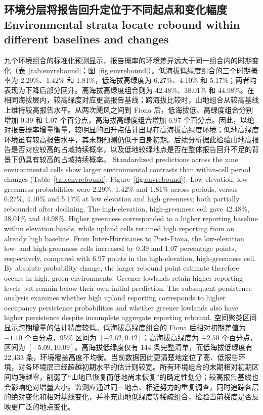 \subsection{\ifzh 环境分层将报告回升定位于不同起点和变化幅度\else Environmental strata locate rebound within different baselines and changes\fi}
\ifzh
九个环境组合的标准化预测显示，报告概率的环境差异远大于同一组合内的时期变化（表~\ref{tab:envrebound}；图~\ref{fig:envrebound}）。低海拔低绿度组合的三个时期概率为 2.29\%、1.42\% 和 1.81\%，低海拔高绿度为 6.27\%、4.10\% 和 5.17\%；两者均表现为下降后部分回升。高海拔高绿度组合则为 42.48\%、38.01\% 和 44.98\%。在相同海拔层内，较高绿度对应更高报告基线；跨海拔比较时，山地组合从较高基线上维持较高报告水平。从两次飓风之间到 Fiona 后，低海拔低、高绿度组合分别增加 0.39 和 1.07 个百分点，高海拔高绿度组合增加 6.97 个百分点。因此，以绝对报告概率增量衡量，较明显的回升点估计出现在高海拔高绿度环境；低地高绿度环境虽有较高报告水平，其末期预测仍低于自身初期。后续分析据此检验山地高报告是否对应较高的占域持续概率，以及低地较绿地点是否在整体报告回升不足的背景下仍具有较高的占域持续概率。
\else
Standardized predictions across the nine environmental cells show larger environmental contrasts than within-cell period changes (Table~\ref{tab:envrebound}; Figure~\ref{fig:envrebound}). Low-elevation, low-greenness probabilities were 2.29\%, 1.42\% and 1.81\% across periods, versus 6.27\%, 4.10\% and 5.17\% at low elevation and high greenness; both partially rebounded after declining. The high-elevation, high-greenness cell gave 42.48\%, 38.01\% and 44.98\%. Higher greenness corresponded to a higher reporting baseline within elevation bands, while upland cells retained high reporting from an already high baseline. From Inter-Hurricanes to Post-Fiona, the low-elevation low- and high-greenness cells increased by 0.39 and 1.07 percentage points, respectively, compared with 6.97 points in the high-elevation, high-greenness cell. By absolute probability change, the larger rebound point estimate therefore occurs in high, green environments. Greener lowlands retain higher reporting levels but remain below their own initial prediction. The subsequent persistence analysis examines whether high upland reporting corresponds to higher occupancy persistence probabilities and whether greener lowlands also have higher persistence despite incomplete aggregate reporting rebound.
\fi
{}
\ifzh
空间聚类区间显示跨期增量的估计精度较低。低海拔高绿度组合的 Fiona 后相对初期差值为 $-1.10$ 个百分点，95\% 区间为 $[-2.62,0.42]$；高海拔高绿度为 $+2.50$ 个百分点，区间为 $[-5.09,10.09]$。高海拔低绿度仅有 144 条完整清单，而低海拔低绿度有 22,433 条，环境覆盖高度不均衡。当前数据因此更清楚地定位了高、低报告环境，对各环境层已经超越初期水平的估计则较宽。所有环境组合的末期相对初期区间均跨越零，削弱了“山地已恢复而低地尚未恢复”的确定性划分；较高报告基线也会影响绝对增量大小。监测应通过同一地点、相近努力的重复调查，同时追踪各层的绝对变化和相对基线变化，并补充山地低绿度等稀疏组合，检验当前梯度是否反映更广泛的地点变化。
